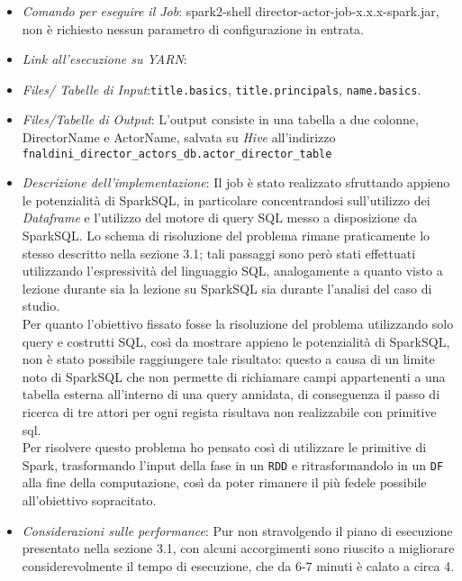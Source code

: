 \documentclass[hidelinks]{article}
\begin{document}
\begin{itemize}
	\item \textit{Comando per eseguire il Job}: spark2-shell director-actor-job-x.x.x-spark.jar, non è richiesto nessun parametro di configurazione in entrata.
	\item \textit{Link all'esecuzione su YARN}:
	\url{}
	
	\item \textit{Files/ Tabelle di Input}:\texttt{title.basics}, \texttt{title.principals}, \texttt{name.basics}.
	\item \textit{Files/Tabelle di Output}: L'output consiste in una tabella a due colonne, DirectorName e ActorName, salvata su \textit{Hive} all'indirizzo  \texttt{fnaldini\_director\_actors\_db.actor\_director\_table}
	\item \textit{Descrizione dell'implementazione}: Il job è stato realizzato sfruttando appieno le potenzialità di SparkSQL, in particolare concentrandosi sull'utilizzo dei \textit{Dataframe} e l'utilizzo del motore di query SQL messo a disposizione da SparkSQL.
	Lo schema di risoluzione del problema rimane praticamente lo stesso descritto nella sezione 3.1; tali passaggi sono però stati effettuati utilizzando l'espressività del linguaggio SQL, analogamente a quanto visto a lezione durante sia la lezione su SparkSQL sia durante l'analisi del caso di studio.\\
	Per quanto l'obiettivo fissato fosse la risoluzione del problema utilizzando solo query e costrutti SQL, così da mostrare appieno le potenzialità di SparkSQL, non è stato possibile raggiungere tale risultato: questo a causa di un limite noto di SparkSQL che non permette di richiamare campi appartenenti a una tabella esterna all'interno di una query annidata, di conseguenza il passo di ricerca di tre attori per ogni regista risultava non realizzabile con primitive sql.\\
	Per risolvere questo problema ho pensato così di utilizzare le primitive di Spark, trasformando l'input della fase in un \texttt{RDD} e ritrasformandolo in un \texttt{DF} alla fine della computazione, così da poter rimanere il più fedele possibile all'obiettivo sopracitato.
	
	\item \textit{Considerazioni sulle performance}: Pur non stravolgendo il piano di esecuzione presentato nella sezione 3.1, con alcuni accorgimenti sono riuscito a migliorare considerevolmente il tempo di esecuzione, che da 6-7 minuti è calato a circa 4.
	

\end{itemize}
\end{document}
